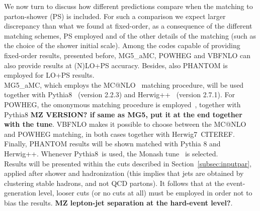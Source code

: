 We now turn to discuss how different predictions compare when the matching to parton-shower (PS) is included. For such
a comparison we expect larger discrepancy than what we found at fixed-order, as a consequence of the different
matching schemes, PS employed and of the other details of the matching (such as the choice of the shower initial scale). Among
the codes capable of providing fixed-order results, presented before, {\sc MG5\_aMC}, {\sc POWHEG} and {\sc VBFNLO}
can also provide results at (N)LO+PS accuracy. Besides, also {\sc PHANTOM} is employed for LO+PS results.\\
{\sc MG5\_aMC},
which
employs the {\sc MC@NLO}~\cite{Frixione:2002ik} matching procedure, will be used together with {\sc Pythia8}~\cite{Sjostrand:2014zea} (version 2.2.3)
and {\sc Herwig++}~\cite{Bahr:2008pv, Bellm:2013hwb} (version 2.7.1). For {\sc POWHEG}, the omonymous matching procedure is 
employed~\cite{Nason:2004rx,Frixione:2007vw}, together with {\sc Pythia8}
{\bf MZ VERSION? if same as MG5, put it at the end together with the tune}. {\sc VBFNLO} makes it possible to choose between the {\sc MC@NLO} and {\sc POWHEG}
matching, in both cases together with {\sc Herwig7}~CITEREF. Finally, {\sc PHANTOM} results will be shown matched with {\sc Pythia 8} and {\sc Herwig++}.
Whenever {\sc Pythia8}\ is used, the Monash tune~\cite{Skands:2014pea} is selected.\\

Results will be presented within the cuts described in Section~\ref{subsec:inputpar}, applied after shower and hadronization (this implies that jets
are obtained by clustering stable hadrons, and not QCD partons). It follows that at the event-generation level, looser cuts (or no cuts at all)
must be employed in order not to bias the results. {\bf MZ lepton-jet separation at the hard-event level?}.\\

